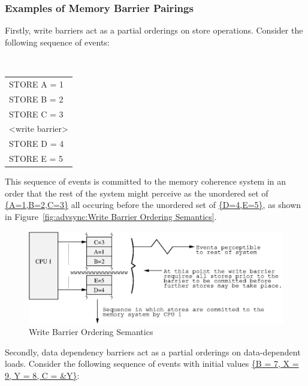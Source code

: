\subsubsection{Examples of Memory Barrier Pairings}
\label{sec:advsync:Examples of Memory Barrier Pairings}

Firstly, write barriers act as a partial orderings on store operations.
Consider the following sequence of events:

\vspace{5pt}
\begin{minipage}[t]{\columnwidth}
\tt
\begin{tabular}{l}
	STORE A = 1 \\
	STORE B = 2 \\
	STORE C = 3 \\
	<write barrier> \\
	STORE D = 4 \\
	STORE E = 5 \\
\end{tabular}
\end{minipage}
\vspace{5pt}

This sequence of events is committed to the memory coherence system in an order
that the rest of the system might perceive as the unordered set of
\url{{A=1,B=2,C=3}}
all occuring before the unordered set of
\url{{D=4,E=5}}, as shown in
Figure~\ref{fig:advsync:Write Barrier Ordering Semantics}.

\begin{figure}[htb]
\begin{center}
\includegraphics{advsync/WriteBarrierOrdering}
\end{center}
\caption{Write Barrier Ordering Semantics}
\end{figure}

Secondly, data dependency barriers act as a partial orderings on data-dependent
loads.  Consider the following sequence of events with initial values
\url{{B = 7, X = 9, Y = 8, C = &Y}}:

